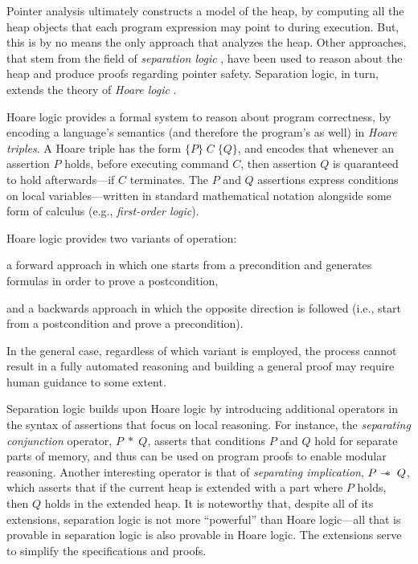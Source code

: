 Pointer analysis ultimately constructs a model of the heap, by computing all the heap objects that each program expression may point to during execution. But, this is by no means the only approach that analyzes the heap. Other approaches, that stem from the field of \emph{separation logic} \todo{}, have been used to reason about the heap and produce proofs regarding pointer safety. Separation logic, in turn, extends the theory of \emph{Hoare logic} \todo{}.

Hoare logic provides a formal system to reason about program correctness, by encoding a language's semantics (and therefore the program's as well) in \emph{Hoare triples}. A Hoare triple has the form $\{P\} \; C \;  \{Q\}$, and encodes that whenever an assertion $P$ holds, before executing command $C$, then assertion $Q$ is quaranteed to hold afterwards---if $C$ terminates. The $P$ and $Q$ assertions express conditions on local variables---written in standard mathematical notation alongside some form of calculus (e.g., \emph{first-order logic}).

Hoare logic provides two variants of operation:
\begin{inparaenum}[(1)]
\item a forward approach in which one starts from a precondition and generates formulas in order to prove a postcondition,
\item and a backwards approach in which the opposite direction is followed (i.e., start from a postcondition and prove a precondition).
\end{inparaenum}
In the general case, regardless of which variant is employed, the process cannot result in a fully automated reasoning and building a general proof may require human guidance to some extent.

Separation logic builds upon Hoare logic by introducing additional operators in the syntax of assertions that focus on local reasoning. For instance, the \emph{separating conjunction} operator, $P \; * \; Q$, asserts that conditions $P$ and $Q$ hold for separate parts of memory, and thus can be used on program proofs to enable modular reasoning. Another interesting operator is that of \emph{separating implication}, $P \mathrel{-\mkern-6mu*} \; Q$, which asserts that if the current heap is extended with a part where $P$ holds, then $Q$ holds in the extended heap. It is noteworthy that, despite all of its extensions, separation logic is not more ``powerful'' than Hoare logic---all that is provable in separation logic is also provable in Hoare logic. The extensions serve to simplify the specifications and proofs.

